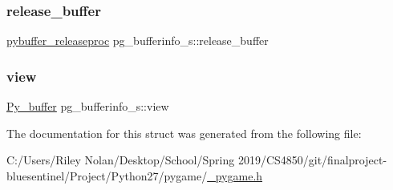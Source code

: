 \subsubsection{\texorpdfstring{release\_buffer}{release\_buffer}}
{\footnotesize\ttfamily \mbox{\hyperlink{__pygame_8h_ad02fd84ceaf918398aa37e358cd2cc3f}{pybuffer\+\_\+releaseproc}} pg\+\_\+bufferinfo\+\_\+s\+::release\+\_\+buffer}

\mbox{\label{structpg__bufferinfo__s_adb572aee8152d8eb6f08c9ed2ffe465c}} 
\subsubsection{\texorpdfstring{view}{view}}
{\footnotesize\ttfamily \mbox{\hyperlink{_python27_2object_8h_a0c1c5dc66cfb07c46b863b5186f61cf4}{Py\+\_\+buffer}} pg\+\_\+bufferinfo\+\_\+s\+::view}



The documentation for this struct was generated from the following file\+:\begin{DoxyCompactItemize}
\item 
C\+:/\+Users/\+Riley Nolan/\+Desktop/\+School/\+Spring 2019/\+C\+S4850/git/finalproject-\/bluesentinel/\+Project/\+Python27/pygame/\mbox{\hyperlink{__pygame_8h}{\+\_\+pygame.\+h}}\end{DoxyCompactItemize}
